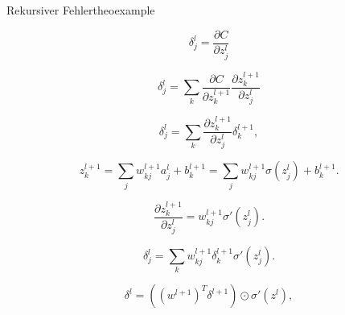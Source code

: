 \begin{myderivation}{Rekursiver Fehler}{theoexample} \label{deri:grad}

\begin{equation} \label{eq:recErr1}
\delta^l_j = \frac{\partial C}{\partial z^l_j}
\end{equation}

\begin{equation} \label{eq:recErr2}
\delta^l_j = \sum_k \frac{\partial C}{\partial z^{l+1}_k} \frac{\partial z^{l+1}_k}{\partial z^l_j} 
\end{equation}

\begin{equation} \label{eq:recErr3}
\delta^l_j = \sum_k \frac{\partial z^{l+1}_k}{\partial z^l_j} \delta^{l+1}_k,
\end{equation}

\begin{equation} \label{eq:recErr4}
z^{l+1}_k = \sum_j w^{l+1}_{kj} a^l_j +b^{l+1}_k = \sum_j w^{l+1}_{kj} \sigma(z^l_j) +b^{l+1}_k.
\end{equation}

\begin{equation} \label{eq:recErr5}
\frac{\partial z^{l+1}_k}{\partial z^l_j} = w^{l+1}_{kj} \sigma'(z^l_j).
\end{equation}

\begin{equation} \label{eq:recErr6}
\delta^l_j = \sum_k w^{l+1}_{kj}  \delta^{l+1}_k \sigma'(z^l_j).
\end{equation}

\begin{equation} \label{eq:recErr7}
\delta^l = ((w^{l+1})^T \delta^{l+1}) \odot \sigma'(z^l),
\end{equation}

\end{myderivation}




